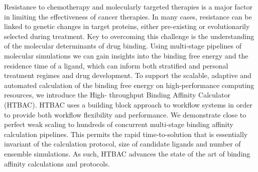 Resistance to chemotherapy and molecularly targeted therapies is a major
factor in limiting the effectiveness of cancer therapies. In many cases,
resistance can be linked to genetic changes in target proteins, either
pre-existing or evolutionarily selected during treatment. Key to overcoming
this challenge is the understanding of the molecular determinants of drug
binding. Using multi-stage pipelines of molecular simulations we can gain
insights into the binding free energy and the residence time of a ligand,
which can inform both stratified and personal treatment regimes and drug
development.
To support the scalable, adaptive and automated calculation of the binding
free energy on high-performance computing resources, we introduce the High-
throughput Binding Affinity Calculator (HTBAC). HTBAC uses a building block
approach to workflow systems in order to provide both workflow flexibility and
performance. We demonstrate close to perfect weak scaling to hundreds of
concurrent multi-stage binding affinity calculation pipelines. This permits
the rapid time-to-solution that is essentially invariant of the calculation
protocol, size of candidate ligands and number of ensemble simulations. As
such, HTBAC advances the state of the art of binding affinity calculations and
protocols.